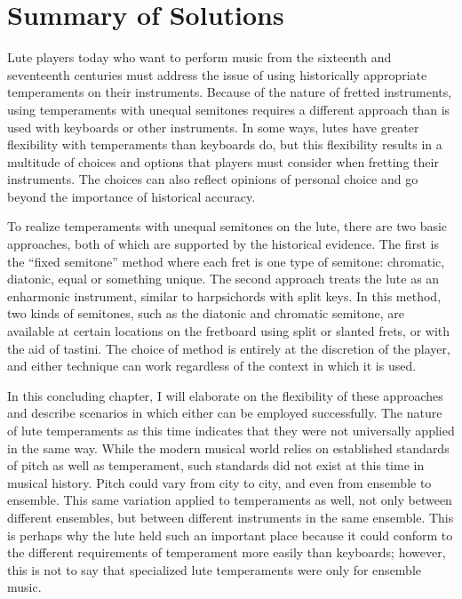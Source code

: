 \chapter{Summary of Solutions}

Lute players today who want to perform music from the sixteenth and seventeenth
centuries must address the issue of using historically appropriate temperaments on
their instruments. Because of the nature of fretted instruments, using temperaments
with unequal semitones requires a different approach than is used with keyboards or
other instruments. In some ways, lutes have greater flexibility with temperaments than
keyboards do, but this flexibility results in a multitude of choices and options that
players must consider when fretting their instruments. The choices can also reflect
opinions of personal choice and go beyond the importance of historical accuracy.

To realize temperaments with unequal semitones on the lute, there are two basic
approaches, both of which are supported by the historical evidence. The first is the
``fixed semitone'' method where each fret is one type of semitone: chromatic, diatonic,
equal or something unique. The second approach treats the lute as an enharmonic
instrument, similar to harpsichords with split keys. In this method, two kinds of
semitones, such as the diatonic and chromatic semitone, are available at
certain locations on the fretboard using split or slanted frets, or with the aid of
tastini. The choice of method is entirely at the discretion of the player, and either
technique can work regardless of the context in which it is used.

In this concluding chapter, I will elaborate on the flexibility of these approaches and
describe scenarios in which either can be employed successfully. The nature of lute
temperaments as this time indicates that they were not universally applied in the same
way. While the modern musical world relies on established standards of pitch as well
as temperament, such standards did not exist at this time in musical history. Pitch
could vary from city to city, and even from ensemble to ensemble. This same variation
applied to temperaments as well, not only between different ensembles, but between
different instruments in the same ensemble. This is perhaps why the lute held such an
important place because it could conform to the different requirements of temperament
more easily than keyboards; however, this is not to say that specialized lute
temperaments were only for ensemble music.

